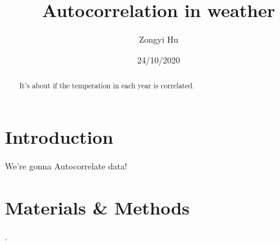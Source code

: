 \documentclass[12pt]{article}
\title{Autocorrelation in weather}
\author{Zongyi Hu}
\date{24/10/2020}
\begin{document}
  \maketitle
  
  \begin{abstract}
    It's about if the temperation in each year is correlated.
  \end{abstract}
  
  \section{Introduction}
    We're gonna Autocorrelate data!
  
  \section{Materials \& Methods}

  \cite{einstein1905does}.
  
  
  
\end{document}
